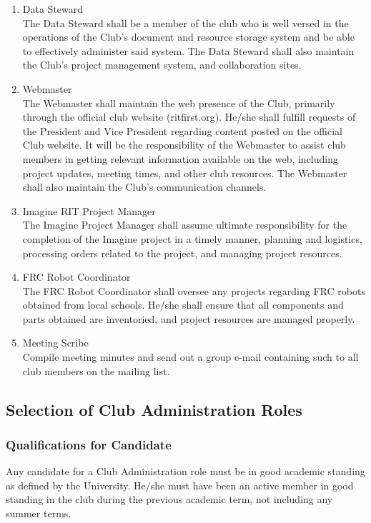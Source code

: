 \documentclass[english,11pt]{article}
\begin{document}
\begin{enumerate}[label=\Alph*.]
    \item {\large Data Steward} \\
            The Data Steward shall be a member of the club who is well versed in the operations of the Club's document and resource storage system and be able to effectively administer said system.
            The Data Steward shall also maintain the Club's project management system, and collaboration sites.
    \item {\large Webmaster} \\
            The Webmaster shall maintain the web presence of the Club, primarily through the official club website (ritfirst.org).
            He/she shall fulfill requests of the President and Vice President regarding content posted on the official Club website.
            It will be the responsibility of the Webmaster to assist club members in getting relevant information available on the web, including project updates, meeting times, and other club resources.
            The Webmaster shall also maintain the Club's communication channels.
    \item {\large Imagine RIT Project Manager} \\
            The Imagine Project Manager shall assume ultimate responsibility for the completion of the Imagine project in a timely manner, planning and logistics, processing orders related to the project, and managing project resources.
    \item {\large FRC Robot Coordinator} \\
            The FRC Robot Coordinator shall oversee any projects regarding FRC robots obtained from local schools. He/she shall ensure that all components and parts obtained are inventoried, and project resources are managed properly.
    \item {\large Meeting Scribe} \\
            Compile meeting minutes and send out a group e-mail containing such to all club members on the mailing list.
\end{enumerate}

\subsection{Selection of Club Administration Roles} \label{sect:cadmin:selection}
\subsubsection{Qualifications for Candidate} \label{subsect:cadmin:selection:qualifications}
Any candidate for a Club Administration role must be in good academic standing as defined by the University.
He/she must have been an active member in good standing in the club during the previous academic term, not including any summer terms.
\end{document}
